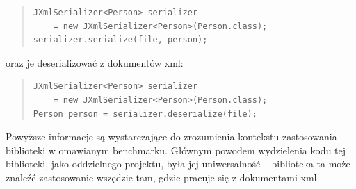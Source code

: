 \begin{quote}
\begin{Verbatim}
JXmlSerializer<Person> serializer 
	= new JXmlSerializer<Person>(Person.class);
serializer.serialize(file, person);
\end{Verbatim}
\end{quote}
oraz je deserializować z dokumentów xml:
\begin{quote}
\begin{Verbatim}
JXmlSerializer<Person> serializer 
	= new JXmlSerializer<Person>(Person.class);
Person person = serializer.deserialize(file);
\end{Verbatim}
\end{quote}
Powyższe informacje są wystarczające do zrozumienia kontekstu zastosowania biblioteki w omawianym benchmarku.
Głównym powodem wydzielenia kodu tej biblioteki, jako oddzielnego projektu, była jej uniwersalność -- biblioteka ta
może znaleźć zastosowanie wszędzie tam, gdzie pracuje się z dokumentami xml.

